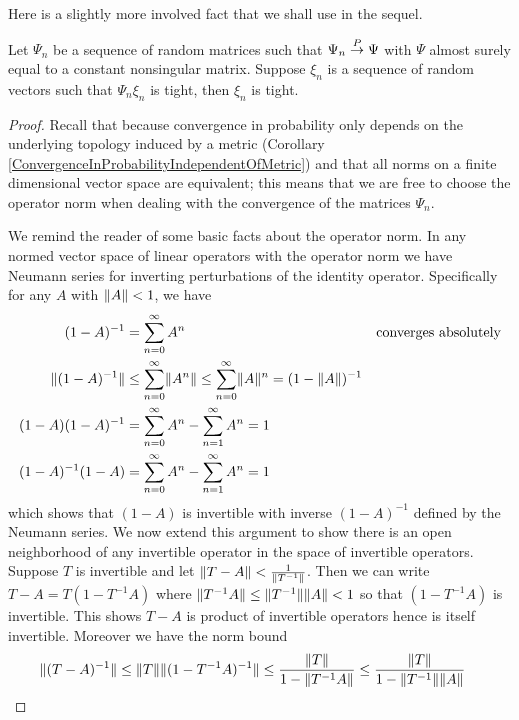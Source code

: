 Here is a slightly more involved fact that we shall use in the sequel.
\begin{lem}\label{InvertMatrixInProbability}Let $\Psi_n$ be a sequence of
  random matrices such that $\Psi_n \overset{P}\to \Psi$ with $\Psi$ almost surely
  equal to a constant nonsingular matrix.  Suppose $\xi_n$ is a
  sequence of random vectors such that $\Psi_n \xi_n$ is tight, then
  $\xi_n$ is tight.
\end{lem}
\begin{proof}
Recall that because convergence in
probability only depends on the underlying topology induced by a
metric (Corollary \ref{ConvergenceInProbabilityIndependentOfMetric})
and that all norms on a finite dimensional vector space are
equivalent; this means that we are free to choose the operator norm when dealing with
the convergence of the matrices $\Psi_n$.  

We remind the reader of some basic facts about the operator norm.  
In any normed vector space of linear operators with the operator norm
we have Neumann series for inverting perturbations of the identity
operator.  Specifically for any $A$ with $\lVert A \rVert < 1$, we have
\begin{align*}
(1 - A)^{-1} &= \sum_{n=0}^\infty A^n & & \text{converges absolutely} \\
\lVert (1 - A)^{-1} \rVert &\leq \sum_{n=0}^\infty \lVert A^n \rVert \leq 
\sum_{n=0}^\infty \lVert A \rVert^n = (1 - \lVert A \rVert)^{-1} \\
(1-A) (1 - A)^{-1} &= \sum_{n=0}^\infty A^n - \sum_{n=1}^\infty A^n =
1 \\
(1 - A)^{-1}(1-A) &= \sum_{n=0}^\infty A^n - \sum_{n=1}^\infty A^n =
1 \\
\end{align*}
which shows that $(1-A)$ is invertible with inverse $(1-A)^{-1}$
defined by the Neumann series.  We now extend this argument
to show there is an  open neighborhood of any invertible operator in
the space of invertible operators.  Suppose $T$ is invertible and let
$\lVert T - A \rVert < \frac{1}{\lVert T^{-1} \rVert}$.  Then we can write $T - A =
T(1 - T^{-1}A)$ where $\lVert T^{-1}A \rVert \leq \lVert T^{-1} \rVert\lVert A \rVert < 1$
so that $(1-T^{-1}A)$ is invertible.  This shows $T-A$ is product of
invertible operators hence is itself invertible.  Moreover we have the
norm bound
\begin{align*}
\lVert (T-A)^{-1} \rVert &\leq \lVert T \rVert\lVert (1 - T^{-1}A)^{-1} \rVert \leq
\frac{\lVert T \rVert}{1 -
\lVert T^{-1}A \rVert} \leq \frac{\lVert T \rVert}{1 -
\lVert T^{-1} \rVert\lVert A \rVert}
\end{align*}


\end{proof}
